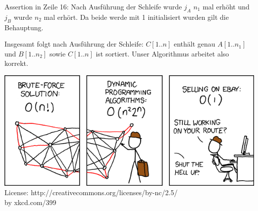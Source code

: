 \documentclass[18pt]{beamer}
\begin{document}
\begin{frame}{Assertion in Zeile 16:} 
Nach Ausführung der Schleife wurde $j_A$ $n_1$ mal erhöht und $j_B$ wurde $n_2$ mal erhört. Da beide werde mit 1 initialisiert wurden gilt die Behauptung.  

Insgesamt folgt nach Ausführung der Schleife:  $C[1..n]$ enthält genau $A[1..n_1]$ und $B[1..n_2]$ sowie $C[1..n]$ ist sortiert. Unser Algorithmus arbeitet also korrekt.
 
\end{frame}


\begin{frame}
\includegraphics[scale=0.5]{travelling_salesman_problem} \\
License: http://creativecommons.org/licenses/by-nc/2.5/ \\
by xkcd.com/399
\end{frame}
\end{document}
